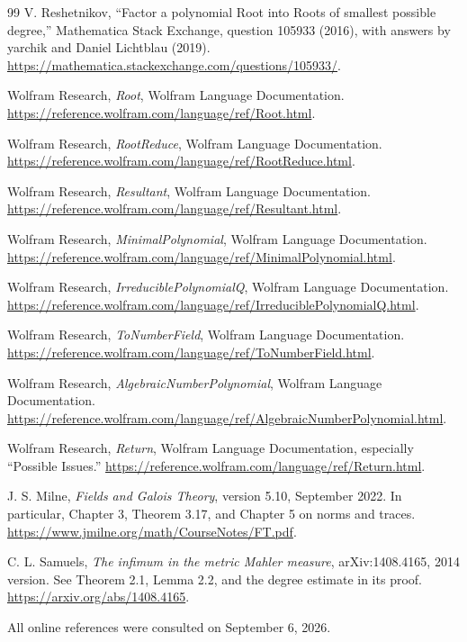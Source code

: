 \documentclass[11pt,a4paper]{article}
\theoremstyle{definition}
\theoremstyle{remark}
\begin{document}
\begin{thebibliography}{99}
V. Reshetnikov, ``Factor a polynomial Root into Roots of smallest possible degree,'' Mathematica Stack Exchange, question 105933 (2016), with answers by yarchik and Daniel Lichtblau (2019).
\url{https://mathematica.stackexchange.com/questions/105933/}.

Wolfram Research, \emph{Root}, Wolfram Language Documentation.
\url{https://reference.wolfram.com/language/ref/Root.html}.

Wolfram Research, \emph{RootReduce}, Wolfram Language Documentation.
\url{https://reference.wolfram.com/language/ref/RootReduce.html}.

Wolfram Research, \emph{Resultant}, Wolfram Language Documentation.
\url{https://reference.wolfram.com/language/ref/Resultant.html}.

Wolfram Research, \emph{MinimalPolynomial}, Wolfram Language Documentation.
\url{https://reference.wolfram.com/language/ref/MinimalPolynomial.html}.

Wolfram Research, \emph{IrreduciblePolynomialQ}, Wolfram Language Documentation.
\url{https://reference.wolfram.com/language/ref/IrreduciblePolynomialQ.html}.

Wolfram Research, \emph{ToNumberField}, Wolfram Language Documentation.
\url{https://reference.wolfram.com/language/ref/ToNumberField.html}.

Wolfram Research, \emph{AlgebraicNumberPolynomial}, Wolfram Language Documentation.
\url{https://reference.wolfram.com/language/ref/AlgebraicNumberPolynomial.html}.

Wolfram Research, \emph{Return}, Wolfram Language Documentation, especially ``Possible Issues.''
\url{https://reference.wolfram.com/language/ref/Return.html}.

J. S. Milne, \emph{Fields and Galois Theory}, version 5.10, September 2022. In particular, Chapter 3, Theorem 3.17, and Chapter 5 on norms and traces.
\url{https://www.jmilne.org/math/CourseNotes/FT.pdf}.

C. L. Samuels, \emph{The infimum in the metric Mahler measure}, arXiv:1408.4165, 2014 version. See Theorem 2.1, Lemma 2.2, and the degree estimate in its proof.
\url{https://arxiv.org/abs/1408.4165}.
\end{thebibliography}
\small All online references were consulted on September 6, 2026.
\end{document}
